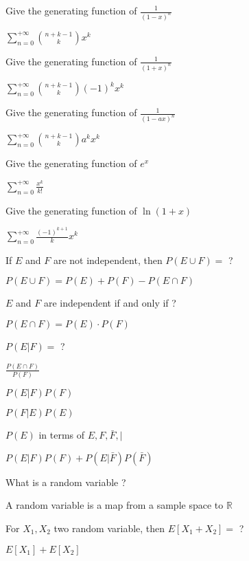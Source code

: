\documentclass[12pt]{article}
\newcommand*{\xfield}[1]{\begin{mdframed}\centering #1\end{mdframed}\bigskip}
\newenvironment{note}{}{}
\begin{document}
\begin{note}
	\xfield{Give the generating function of $\frac{1}{(1-x)^n}$}
	\xfield{$\sum\limits_{n=0}^{+{\infty}}{\binom{n+k-1}{k}x^k}$}
\end{note}

\begin{note}
	\xfield{Give the generating function of $\frac{1}{(1+x)^n}$}
	\xfield{$\sum\limits_{n=0}^{+{\infty}}{\binom{n+k-1}{k}(-1)^k x^k}$}
\end{note}

\begin{note}
	\xfield{Give the generating function of $\frac{1}{(1-ax)^n}$}
	\xfield{$\sum\limits_{n=0}^{+{\infty}}{\binom{n+k-1}{k}a^k x^k}$}
\end{note}

\begin{note}
	\xfield{Give the generating function of $e^x$}
	\xfield{$\sum\limits_{n=0}^{+{\infty}}{\frac{x^k}{k!}}$}
\end{note}

\begin{note}
	\xfield{Give the generating function of $\ln(1+x)$}
	\xfield{$\sum\limits_{n=0}^{+{\infty}}{\frac{(-1)^{k+1}}{k}x^k}$}
\end{note}

\begin{note}
	\xfield{If $E$ and $F$ are not independent, then $P(E\cup F) = $ ?}
	\xfield{$P(E\cup F) = P(E) + P(F) - P(E\cap F)$}
\end{note}

\begin{note}
	\xfield{$E$ and $F$ are independent if and only if ?}
	\xfield{$P(E\cap F) = P(E) \cdot P(F)$}
\end{note}

\begin{note}
	\xfield{$P(E\vert F) = $ ?}
	\xfield{$\frac{P(E\cap F)}{P(F)}$}
\end{note}

\begin{note}
	\xfield{$P(E\vert F)P(F)$}
	\xfield{$P(F\vert E)P(E)$}
\end{note}

\begin{note}
	\xfield{$P(E)$ in terms of $E,F,\bar{F},\vert$}
	\xfield{$P(E\vert F)P(F)+P(E\vert \bar{F})P(\bar{F})$}
\end{note}

\begin{note}
	\xfield{What is a random variable ?}
	\xfield{A random variable is a map from a sample space to $\mathbb{R}$}
\end{note}

\begin{note}
	\xfield{For $X_1,X_2$ two random variable, then $E[X_1 + X_2] = $ ?}
	\xfield{$E[X_1]+E[X_2]$}
\end{note}
\end{document}

